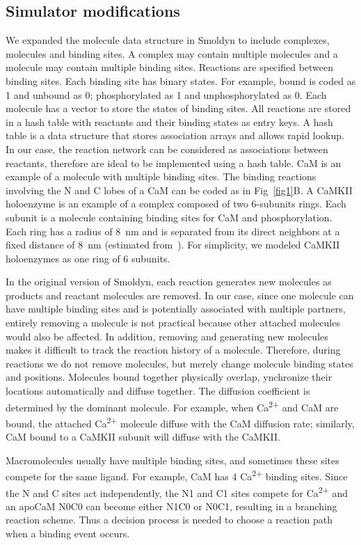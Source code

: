 \documentclass[10pt,letterpaper]{article}
\begin{document}
\subsection*{Simulator modifications}

We expanded the molecule data structure in Smoldyn to include complexes, molecules and binding sites. A complex may contain multiple molecules and a molecule may contain multiple binding sites. Reactions are specified between binding sites. Each binding site has binary states. For example, bound is coded as 1 and unbound as 0; phosphorylated as 1 and unphosphorylated as 0. Each molecule has a vector to store the states of binding sites. All reactions are stored in a hash table with reactants and their binding states as entry keys. A hash table is a data structure that stores association arrays and allows rapid lookup. In our case, the reaction network can be considered as associations between reactants, therefore are ideal to be implemented using a hash table.
CaM is an example of a molecule with multiple binding sites. The binding reactions involving the N and C lobes of a CaM can be coded as in Fig~\ref{fig1}B. A CaMKII holoenzyme is an example of a complex composed of two 6-subunits rings. Each subunit is a molecule containing binding sites for CaM and phosphorylation. Each ring has a radius of \SI{8}{\nm} and is separated from its direct neighbors at a fixed distance of \SI{8}{\nm} (estimated from~\cite{Gaertner:2004jk}). For simplicity, we modeled CaMKII holoenzymes as one ring of 6 subunits.

In the original version of Smoldyn, each reaction generates new molecules as products and reactant molecules are removed. In our case, since one molecule can have multiple binding sites and is potentially associated with multiple partners, entirely removing a molecule is not practical because other attached molecules would also be affected. In addition, removing and generating new molecules makes it difficult to track the reaction history of a molecule. Therefore, during reactions we do not remove molecules, but merely change molecule binding states and positions. Molecules bound together physically overlap, ynchronize their locations automatically and diffuse together. The diffusion coefficient is determined by the dominant molecule. For example, when Ca\textsuperscript{2+} and CaM are bound, the attached Ca\textsuperscript{2+} molecule diffuse with the CaM diffusion rate; similarly, CaM bound to a CaMKII subunit will diffuse with the CaMKII.

Macromolecules usually have multiple binding sites, and sometimes these sites compete for the same ligand. For example, CaM has 4 Ca\textsuperscript{2+} binding sites. Since the N and C sites act independently, the N1 and C1 sites compete for Ca\textsuperscript{2+} and an apoCaM N0C0 can become either N1C0 or N0C1, resulting in a branching reaction scheme. Thus a decision process is needed to choose a reaction path when a binding event occurs. 
\end{document}
